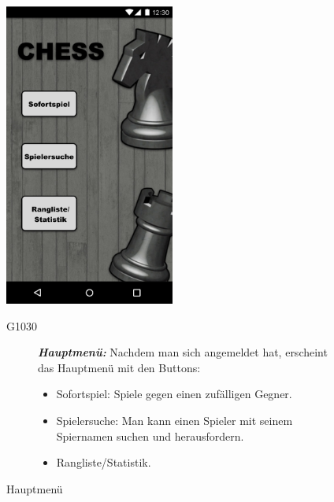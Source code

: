\documentclass[parskip=full]{scrartcl}
\begin{document}
	\begin{figure}[htp]
		\begin{minipage}[t]{6cm}
			\vspace{0pt}
			\includegraphics[height=100mm]{hauptmenu.png}
			\caption{Hauptmenü}
			\label{fig:Hauptmenü}
		\end{minipage}
		\hfill
		\begin{minipage}[t]{6cm}
			\vspace{0pt}
			\begin{description}
				\item[G1030] \textbf{\textit{Hauptmenü: }} Nachdem man sich angemeldet hat, erscheint das Hauptmenü mit den Buttons:
				\begin{itemize}			
					\item Sofortspiel: Spiele gegen einen zufälligen Gegner.
					\item Spielersuche: Man kann einen Spieler mit seinem Spiernamen suchen und herausfordern.
					\item Rangliste/Statistik.
				\end{itemize}
			\end{description}
		\end{minipage}
		

\end{figure}
\end{document}
